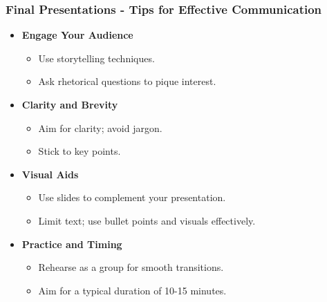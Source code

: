 \documentclass{beamer}
\begin{document}
\begin{frame}[fragile]
    \frametitle{Final Presentations - Tips for Effective Communication}
    \begin{itemize}
        \item \textbf{Engage Your Audience}
        \begin{itemize}
            \item Use storytelling techniques.
            \item Ask rhetorical questions to pique interest.
        \end{itemize}
        
        \item \textbf{Clarity and Brevity}
        \begin{itemize}
            \item Aim for clarity; avoid jargon.
            \item Stick to key points.
        \end{itemize}
        
        \item \textbf{Visual Aids}
        \begin{itemize}
            \item Use slides to complement your presentation.
            \item Limit text; use bullet points and visuals effectively.
        \end{itemize}
        
        \item \textbf{Practice and Timing}
        \begin{itemize}
            \item Rehearse as a group for smooth transitions.
            \item Aim for a typical duration of 10-15 minutes.
        \end{itemize}
    \end{itemize}
\end{frame}
\end{document}
